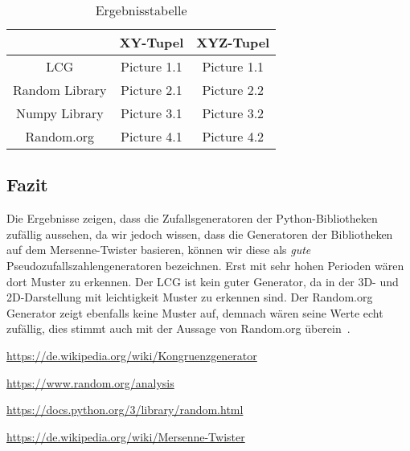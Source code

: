 \documentclass[12pt]{article}
\begin{document}
    \begin{table}[h]

        \caption[Ergebnisstabelle]{Ergebnisstabelle}

        \centering

        \begin{tabular}{|c||c|c|}

            \hline
            & XY-Tupel & XYZ-Tupel \\

            \hline
            \hline
            LCG & Picture 1.1 & Picture 1.1 \\

            \hline
            Random Library & Picture 2.1 & Picture 2.2 \\

            \hline
            Numpy Library & Picture 3.1 & Picture 3.2 \\

            \hline
            Random.org & Picture 4.1 & Picture 4.2 \\

            \hline

        \end{tabular}\label{tab:ergebnisse}

    \end{table}

    \subsection{Fazit}\label{subsec:fazit}
    Die Ergebnisse zeigen, dass die Zufallsgeneratoren der Python-Bibliotheken zufällig aussehen, da wir jedoch wissen,
    dass die Generatoren der Bibliotheken auf dem Mersenne-Twister basieren,
    können wir diese als \textit{gute} Pseudozufallszahlengeneratoren bezeichnen.
    Erst mit sehr hohen Perioden wären dort Muster zu erkennen.
    Der LCG ist kein guter Generator, da in der 3D- und 2D-Darstellung mit leichtigkeit Muster zu erkennen sind.
    Der Random.org Generator zeigt ebenfalls keine Muster auf, demnach wären seine Werte echt zufällig,
    dies stimmt auch mit der Aussage von Random.org überein~\cite{random-org}.


    \vfill

    \begin{thebibliography}{12345}

        \url{https://de.wikipedia.org/wiki/Kongruenzgenerator}

        \url{https://www.random.org/analysis}

        \url{https://docs.python.org/3/library/random.html}

        \url{https://de.wikipedia.org/wiki/Mersenne-Twister}

    \end{thebibliography}
\end{document}
